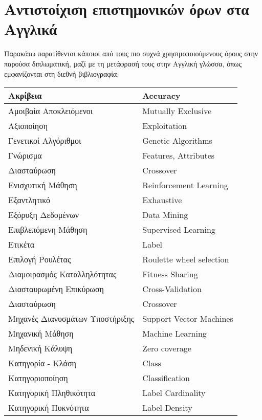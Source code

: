 \chapter{Αντιστοίχιση επιστημονικών όρων στα Αγγλικά}

Παρακάτω παρατίθενται κάποιοι από τους πιο συχνά χρησιμοποιούμενους όρους στην παρούσα διπλωματική, μαζί με τη μετάφρασή τους στην Αγγλική γλώσσα, όπως εμφανίζονται στη διεθνή βιβλιογραφία.

\begin{center}
\begin{longtable}{ll}
Ακρίβεια & Accuracy												\\ \hline
Αμοιβαία Αποκλειόμενοι & Mutually Exclusive						\\ \hline
Αξιοποίηση & Exploitation										\\ \hline
Γενετικοί Αλγόριθμοι & Genetic Algorithms						\\ \hline
Γνώρισμα & Features, Attributes									\\ \hline
Διασταύρωση & Crossover											\\ \hline
Ενισχυτική Μάθηση & Reinforcement Learning						\\ \hline
Εξαντλητικό & Exhaustive										\\ \hline 
Εξόρυξη Δεδομένων & Data Mining									\\ \hline 
Επιβλεπόμενη Μάθηση & Supervised Learning						\\ \hline
Ετικέτα & Label													\\ \hline
Επιλογή Ρουλέτας & Roulette wheel selection						\\ \hline
Διαμοιρασμός Καταλληλότητας & Fitness Sharing					\\ \hline
Διασταυρωμένη Επικύρωση & Cross-Validation						\\ \hline
Διασταύρωση & Crossover											\\ \hline
Μηχανές Διανυσμάτων Υποστήριξης & Support Vector Machines		\\ \hline
Μηχανική Μάθηση & Machine Learning								\\ \hline
Μηδενική Κάλυψη & Zero coverage									\\ \hline
Κατηγορία - Κλάση & Class										\\ \hline
Κατηγοριοποίηση & Classification								\\ \hline
Κατηγορική Πληθικότητα & Label Cardinality						\\ \hline
Κατηγορική Πυκνότητα & Label Density							\\ \hline

\end{longtable}
\end{center}
